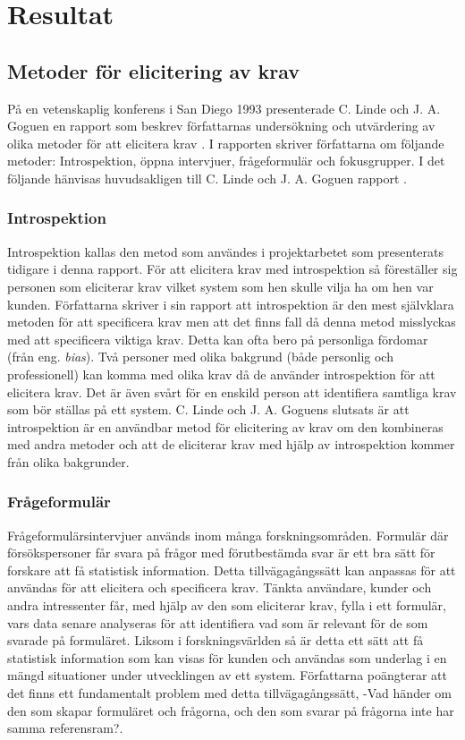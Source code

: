 \section{Resultat}
\label{sec:results-jannering}
\subsection{Metoder för elicitering av krav}
På en vetenskaplig konferens i San Diego 1993 presenterade C. Linde och J. A. Goguen en rapport som beskrev författarnas undersökning och utvärdering av olika metoder för att elicitera krav \cite{goguen1993techniques}. I rapporten skriver författarna om följande metoder: Introspektion, öppna intervjuer, frågeformulär och fokusgrupper. I det följande hänvisas huvudsakligen till C. Linde och J. A. Goguen rapport \cite{goguen1993techniques}. 

\subsubsection{Introspektion}
Introspektion kallas den metod som användes i projektarbetet som presenterats tidigare i denna rapport. För att elicitera krav med introspektion så föreställer sig personen som eliciterar krav vilket system som hen skulle vilja ha om hen var kunden. Författarna skriver i sin rapport att introspektion är den mest självklara metoden för att specificera krav men att det finns fall då denna metod misslyckas med att specificera viktiga krav. Detta kan ofta bero på personliga fördomar (från eng. \textit{bias}). Två personer med olika bakgrund (både personlig och professionell) kan komma med olika krav då de använder introspektion för att elicitera krav. Det är även svårt för en enskild person att identifiera samtliga krav som bör ställas på ett system.  C. Linde och J. A. Goguens slutsats är att introspektion är en användbar metod för elicitering av krav om den kombineras med andra metoder och att de eliciterar krav med hjälp av introspektion kommer från olika bakgrunder. 

\subsubsection{Frågeformulär}
Frågeformulärsintervjuer används inom många forskningsområden. Formulär där försökspersoner får svara på frågor med förutbestämda svar är ett bra sätt för forskare att få statistisk information. Detta tillvägagångssätt kan anpassas för att användas för att elicitera och specificera krav. Tänkta användare, kunder och andra intressenter får, med hjälp av den som eliciterar krav, fylla i ett formulär, vars data senare analyseras för att identifiera vad som är relevant för de som svarade på formuläret. Liksom i forskningsvärlden så är detta ett sätt att få statistisk information som kan visas för kunden och användas som underlag i en mängd situationer under utvecklingen av ett system. Författarna poängterar att det finns ett fundamentalt problem med detta tillvägagångssätt, -Vad händer om den som skapar formuläret och frågorna, och den som svarar på frågorna inte har samma referensram?.
 
